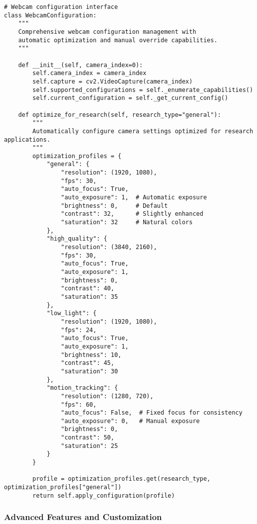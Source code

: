 \documentclass[11pt,a4paper]{article}
\begin{document}
\begin{verbatim}
# Webcam configuration interface
class WebcamConfiguration:
    """
    Comprehensive webcam configuration management with
    automatic optimization and manual override capabilities.
    """

    def __init__(self, camera_index=0):
        self.camera_index = camera_index
        self.capture = cv2.VideoCapture(camera_index)
        self.supported_configurations = self._enumerate_capabilities()
        self.current_configuration = self._get_current_config()

    def optimize_for_research(self, research_type="general"):
        """
        Automatically configure camera settings optimized for research applications.
        """
        optimization_profiles = {
            "general": {
                "resolution": (1920, 1080),
                "fps": 30,
                "auto_focus": True,
                "auto_exposure": 1,  # Automatic exposure
                "brightness": 0,     # Default
                "contrast": 32,      # Slightly enhanced
                "saturation": 32     # Natural colors
            },
            "high_quality": {
                "resolution": (3840, 2160),
                "fps": 30,
                "auto_focus": True,
                "auto_exposure": 1,
                "brightness": 0,
                "contrast": 40,
                "saturation": 35
            },
            "low_light": {
                "resolution": (1920, 1080),
                "fps": 24,
                "auto_focus": True,
                "auto_exposure": 1,
                "brightness": 10,
                "contrast": 45,
                "saturation": 30
            },
            "motion_tracking": {
                "resolution": (1280, 720),
                "fps": 60,
                "auto_focus": False,  # Fixed focus for consistency
                "auto_exposure": 0,   # Manual exposure
                "brightness": 0,
                "contrast": 50,
                "saturation": 25
            }
        }

        profile = optimization_profiles.get(research_type, optimization_profiles["general"])
        return self.apply_configuration(profile)
\end{verbatim}

\subsubsection{Advanced Features and Customization}
\end{document}
